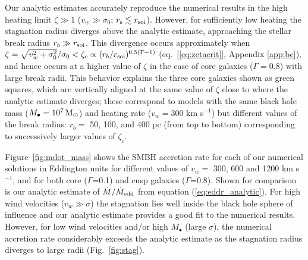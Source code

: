 \documentclass[usenatbib,fleqn]{mn2e}
\newcommand{\Mbh}[1][]{M_{\bullet#1}}
\newcommand{\vwO}{v_{w}}
\begin{document}
Our analytic estimates accurately reproduce the numerical results in the high heating limit $\zeta \gg 1$ ($v_w \gg \sigma_0$; $r_{\rm s} \lesssim r_{\rm soi}$).  However, for sufficiently low heating the stagnation radius diverges above the analytic estimate, approaching the stellar break radius $r_b \gg r_{\rm soi}$.  This divergence occurs approximately when $\zeta = \sqrt{v_w^{2}+\sigma_0^{2}}/\sigma_0 < \zeta_c \propto (r_b/r_{\rm soi})^{0.5(\Gamma-1)}$ (eq.~[\ref{eq:zetacrit}], Appendix \ref{app:be}), and hence occurs at a higher value of $\zeta$ in the case of core galaxies ($\Gamma = 0.8$) with large break radii.  This behavior explains the three core galaxies shown as green squares, which are vertically aligned at the same value of $\zeta$ close to where the analytic estimate diverges; these correspond to models with the same black hole mass ($\Mbh = 10^7 \Msun$) and heating rate ($v_w = 300$ km s$^{-1}$) but different values of the break radius: $r_{b} = $ 50, 100, and 400 pc (from top to bottom) corresponding to successively larger values of $\zeta_c$.  

 Figure~\ref{fig:mdot_mass} shows the SMBH accretion rate for each of our numerical solutions in Eddington units for different values of $\vwO =$ 300, 600 and 1200 km s$^{-1}$, and for both core ($\Gamma$=0.1) and cusp galaxies ($\Gamma$=0.8).  Shown for comparison is our analytic estimate of $\dot{M}/\dot{M}_{\rm edd}$ from equation (\ref{eq:eddr_analytic}).  For high wind velocities ($v_{w} \gg \sigma$) the stagnation lies well inside the black hole sphere of influence and our analytic estimate provides a good fit to the numerical results.  However, for low wind velocities and/or high $M_{\bullet}$ (large $\sigma$), the numerical accretion rate considerably exceeds the analytic estimate as the stagnation radius diverges to large radii (Fig.~\ref{fig:stag}).  
\end{document}
